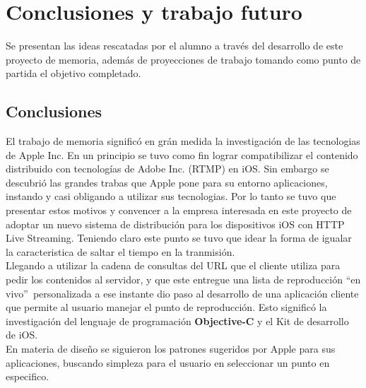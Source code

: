 
\chapter{Conclusiones y trabajo futuro}
Se presentan las ideas rescatadas por el alumno a través del desarrollo de este proyecto de memoria, además de proyecciones de trabajo tomando como punto de partida el objetivo completado.


\section{Conclusiones}

El trabajo de memoria significó en grán medida la investigación de las tecnologias de Apple Inc. En un principio se tuvo como fin lograr compatibilizar el contenido distribuido con tecnologías de Adobe Inc. (RTMP) en iOS. 
Sin embargo se descubrió las grandes trabas que Apple pone para su entorno aplicaciones, instando y casi obligando a utilizar sus tecnologias. 
Por lo tanto se tuvo que presentar estos motivos y convencer a la empresa interesada en este proyecto de adoptar un nuevo sistema de distribución para los dispositivos iOS con HTTP Live Streaming. Teniendo claro este punto se tuvo que idear la forma de igualar la caracteristica de saltar el tiempo en la tranmisión. \\ 

Llegando a utilizar la cadena de consultas del URL que el cliente utiliza para pedir los contenidos al servidor, y que este entregue una lista de reproducción \textquotedblleft en vivo\textquotedblright \ personalizada a ese instante dio paso al desarrollo de una aplicación cliente que permite al usuario manejar el punto de reproducción. Esto significó la investigación del lenguaje de programación \textbf{Objective-C} y el Kit de desarrollo de iOS.\\

En materia de diseño se siguieron los patrones sugeridos por Apple para sus aplicaciones, buscando simpleza para el usuario en seleccionar un punto en especifico.\\

